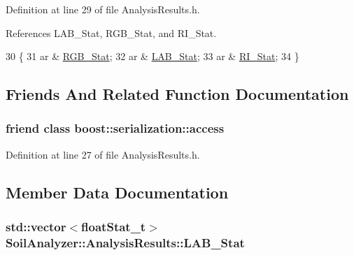 Definition at line 29 of file Analysis\+Results.\+h.



References L\+A\+B\+\_\+\+Stat, R\+G\+B\+\_\+\+Stat, and R\+I\+\_\+\+Stat.


\begin{DoxyCode}
30         \{
31             ar & \hyperlink{class_soil_analyzer_1_1_analysis_results_ab35eca5f2cfca4b80797cfc314d5cdf5}{RGB\_Stat};
32             ar & \hyperlink{class_soil_analyzer_1_1_analysis_results_ae931f7b47ece1f91dc3427520ef4a9b2}{LAB\_Stat};
33             ar & \hyperlink{class_soil_analyzer_1_1_analysis_results_a3bbccb36afd62b9a35b7afa578c4919d}{RI\_Stat};
34         \}
\end{DoxyCode}


\subsection{Friends And Related Function Documentation}
\hypertarget{class_soil_analyzer_1_1_analysis_results_ac98d07dd8f7b70e16ccb9a01abf56b9c}{}
\subsubsection[{boost\+::serialization\+::access}]{\setlength{\rightskip}{0pt plus 5cm}friend class boost\+::serialization\+::access\hspace{0.3cm}{\ttfamily [friend]}}\label{class_soil_analyzer_1_1_analysis_results_ac98d07dd8f7b70e16ccb9a01abf56b9c}


Definition at line 27 of file Analysis\+Results.\+h.



\subsection{Member Data Documentation}
\hypertarget{class_soil_analyzer_1_1_analysis_results_ae931f7b47ece1f91dc3427520ef4a9b2}{}
\subsubsection[{L\+A\+B\+\_\+\+Stat}]{\setlength{\rightskip}{0pt plus 5cm}std\+::vector$<${\bf float\+Stat\+\_\+t}$>$ Soil\+Analyzer\+::\+Analysis\+Results\+::\+L\+A\+B\+\_\+\+Stat}\label{class_soil_analyzer_1_1_analysis_results_ae931f7b47ece1f91dc3427520ef4a9b2}



